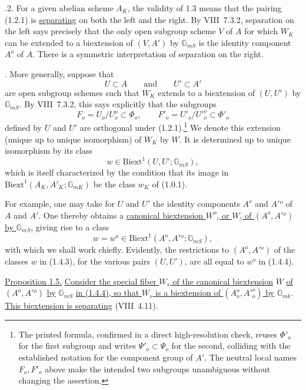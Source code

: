 \medskip
{}.2. For a given abelian scheme $A_K$, the validity of 1.3 means that
the pairing (1.2.1) is \underline{separating} on both the left and the
right.  By VIII~7.3.2, separation on the left says precisely that the
only open subgroup scheme $V$ of $A$ for which $W_K$ can be extended to
a biextension of $(V,A')$ by $\mathbb G_{mS}$ is the identity component
$A^o$ of $A$.  There is a symmetric interpretation of separation on
the right.

\medskip
{}. More generally, suppose that
\begin{equation}\tag{1.4.1}
 U\subset A\qquad\text{and}\qquad U'\subset A'
\end{equation}
are open subgroup schemes such that $W_K$ extends to a biextension of
$(U,U')$ by $\mathbb G_{mS}$.  By VIII~7.3.2, this says explicitly that
the subgroups
\begin{equation}\tag{1.4.2}
 F_o=U_o/U_o^o\subset\Phi_o,
 \qquad
 F'_o=U'_o/{U'}_o^o\subset\Phi'_o
\end{equation}
defined by $U$ and $U'$ are orthogonal under (1.2.1).\footnote{The
printed formula, confirmed in a direct high-resolution check, reuses
$\Phi'_o$ for the first subgroup and writes $\Psi'_o\subset\Psi_o$ for
the second, colliding with the established notation for the component
group of $A'$.  The neutral local names $F_o,F'_o$ above make the
intended two subgroups unambiguous without changing the assertion.}
We denote this extension (unique up to unique isomorphism) of $W_K$ by
$W$.  It is determined up to unique isomorphism by its class
\begin{equation}\tag{1.4.3}
 w\in\mathrm{Biext}^1(U,U';\mathbb G_{mS}),
\end{equation}
which is itself characterized by the condition that its image in
$\mathrm{Biext}^1(A_K,A'_K;\mathbb G_{mK})$ be the class $w_K$ of
(1.0.1).

For example, one may take for $U$ and $U'$ the identity components
$A^o$ and $A'{}^o$ of $A$ and $A'$.  One thereby obtains a
\underline{canonical biextension $W^o$, or $W$, of $(A^o,A'{}^o)$ by
$\mathbb G_{mS}$}, giving rise to a class
\begin{equation}\tag{1.4.4}
 w=w^o\in\mathrm{Biext}^1(A^o,A'{}^o;\mathbb G_{mS}),
\end{equation}
with which we shall work chiefly.  Evidently, the restrictions to
$(A^o,A'{}^o)$ of the classes $w$ in (1.4.3), for the various pairs
$(U,U')$, are all equal to $w^o$ in (1.4.4).

\medskip
\noindent
\underline{Proposition 1.5.} \underline{Consider the special fiber
$W_s$ of the canonical biextension} $W$ \underline{of}
$(A^o,A'{}^o)$ \underline{by} $\mathbb G_{mS}$ \underline{in (1.4.4),
so that $W_s$ is a biextension of $(A_o^o,{A'}_o^o)$ by}
$\mathbb G_{mk}$.  \underline{This biextension is separating}
(VIII~4.11).

